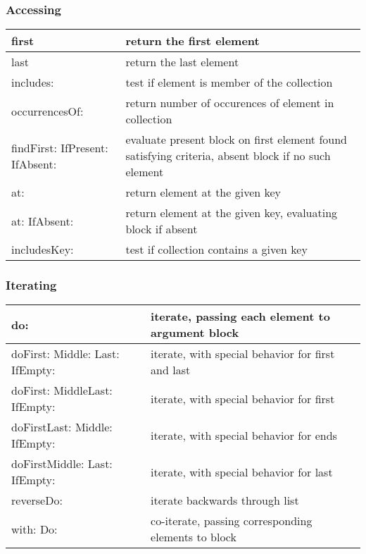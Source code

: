 \documentclass[letterpaper,10pt,english]{sphinxmanual}
\begin{document}
\subsubsection{Accessing}
\label{\detokenize{usefulselectors:accessing}}
\noindent\begin{tabulary}{\linewidth}{p{5cm} p{10cm}}
\hline

first
&
return the first element
\\
\hline
last
&
return the last element
\\
\hline
includes:
&
test if element is member of the collection
\\
\hline
occurrencesOf:
&
return number of occurences of element in collection
\\
\hline
findFirst: IfPresent: IfAbsent:
&
evaluate present block on first element found satisfying criteria, absent block if no such element
\\
\hline
at:
&
return element at the given key
\\
\hline
at: IfAbsent:
&
return element at the given key, evaluating block if absent
\\
\hline
includesKey:
&
test if collection contains a given key
\\
\hline\end{tabulary}



\subsubsection{Iterating}
\label{\detokenize{usefulselectors:iterating}}
\noindent\begin{tabulary}{\linewidth}{p{5cm} p{10cm}}
\hline

do:
&
iterate, passing each element to argument block
\\
\hline
doFirst: Middle: Last: IfEmpty:
&
iterate, with special behavior for first and last
\\
\hline
doFirst: MiddleLast: IfEmpty:
&
iterate, with special behavior for first
\\
\hline
doFirstLast: Middle: IfEmpty:
&
iterate, with special behavior for ends
\\
\hline
doFirstMiddle: Last: IfEmpty:
&
iterate, with special behavior for last
\\
\hline
reverseDo:
&
iterate backwards through list
\\
\hline
with: Do:
&
co-iterate, passing corresponding elements to block
\\
\hline\end{tabulary}
\end{document}
